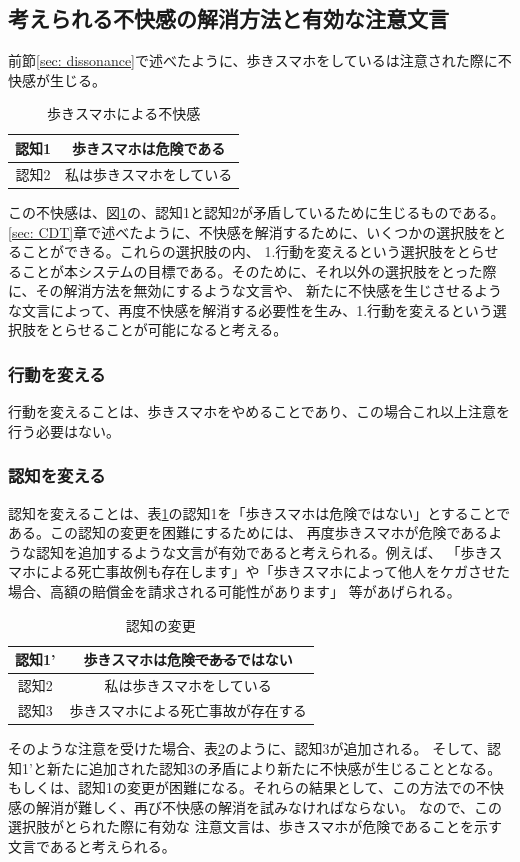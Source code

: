 \documentclass[11pt,a4j]{jreport}
\begin{document}
\subsection{考えられる不快感の解消方法と有効な注意文言}
前節\ref{sec: dissonance}で述べたように、歩きスマホをしているは注意された際に不快感が生じる。
\begin{table}[h]
  \centering
  
  
  \begin{tabular}{c|c}

      認知1 & 歩きスマホは危険である  \\ \hline
      認知2 & 私は歩きスマホをしている \\ 
  \end{tabular}
  \caption{歩きスマホによる不快感}
  \label{fig: UsingPhone}
\end{table}
この不快感は、図\ref{fig: UsingPhone}の、認知1と認知2が矛盾しているために生じるものである。
\ref{sec: CDT}章で述べたように、不快感を解消するために、いくつかの選択肢をとることができる。これらの選択肢の内、
1.行動を変えるという選択肢をとらせることが本システムの目標である。そのために、それ以外の選択肢をとった際に、その解消方法を無効にするような文言や、
新たに不快感を生じさせるような文言によって、再度不快感を解消する必要性を生み、1.行動を変えるという選択肢をとらせることが可能になると考える。

\subsubsection{行動を変える}
行動を変えることは、歩きスマホをやめることであり、この場合これ以上注意を行う必要はない。
\subsubsection{認知を変える}
認知を変えることは、表\ref{fig: UsingPhone}の認知1を「歩きスマホは危険ではない」とすることである。この認知の変更を困難にするためには、
再度歩きスマホが危険であるような認知を追加するような文言が有効であると考えられる。例えば、
「歩きスマホによる死亡事故例も存在します」や「歩きスマホによって他人をケガさせた場合、高額の賠償金を請求される可能性があります」
等があげられる。
\begin{table}[h]
  \centering
  
  
  \begin{tabular}{c|c}
      認知1' & 歩きスマホは危険\sout{である}ではない \\ \hline
      認知2 & 私は歩きスマホをしている \\ \hline
      認知3 & 歩きスマホによる死亡事故が存在する \\
  \end{tabular}
  \caption{認知の変更}
  \label{fig: AvoidDissonanceRevise}
\end{table}
そのような注意を受けた場合、表\ref{fig: AvoidDissonanceRevise}のように、認知3が追加される。
そして、認知1'と新たに追加された認知3の矛盾により新たに不快感が生じることとなる。
もしくは、認知1の変更が困難になる。それらの結果として、この方法での不快感の解消が難しく、再び不快感の解消を試みなければならない。
なので、この選択肢がとられた際に有効な
注意文言は、歩きスマホが危険であることを示す文言であると考えられる。
\end{document}

